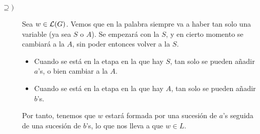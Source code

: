 \begin{ejercicio}
\begin{enumerate}
\begin{description}
            \item[$\supseteq)$] Sea $w\in\mathcal{L}(G)$. Vemos que en la palabra siempre
            va a haber tan solo una variable (ya sea $S$ o $A$). Se empezará con la $S$, y en cierto momento se cambiará a la $A$,
            sin poder entonces volver a la $S$.
            \begin{itemize}
                \item Cuando se está en la etapa en la que hay $S$, tan solo se pueden añadir $a$'s,
                o bien cambiar a la $A$.
                \item Cuando se está en la etapa en la que hay $A$, tan solo se pueden añadir $b$'s.
            \end{itemize}
            Por tanto, tenemos que $w$ estará formada por una sucesión de
            $a$'s seguida de una sucesión de $b$'s, lo que nos lleva a que $w\in L$.
        \end{description}
    \end{enumerate}
\end{ejercicio}


